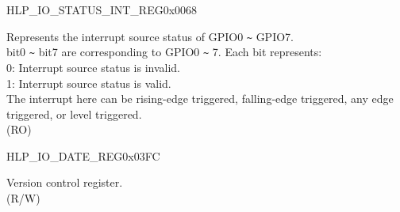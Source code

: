 \begin{register}{H}{LP\_IO\_STATUS\_INT\_REG}{0x0068}\label{regdesc:LPIOSTATUSINTREG}
%
%
\regnewline%
\begin{regdesc}\begin{reglist}
\label{fielddesc:LPGPIOSTATUSINTNEXT}\item [LP\_GPIO\_STATUS\_INT\_NEXT] Represents the interrupt source status of GPIO0 \verb+~+ GPIO7.\\
bit0 \verb+~+ bit7 are corresponding to GPIO0 \verb+~+ 7. Each bit represents:\\
0: Interrupt source status is invalid.\\
1: Interrupt source status is valid.\\ 
The interrupt here can be rising-edge triggered, falling-edge triggered, any edge triggered, or level triggered.\\  (RO)
\end{reglist}\end{regdesc}
\end{register}




\begin{register}{H}{LP\_IO\_DATE\_REG}{0x03FC}\label{regdesc:LPIODATEREG}
%
%
\regnewline%
\begin{regdesc}\begin{reglist}
\label{fielddesc:LPIODATE}\item [LP\_IO\_DATE] Version control register. \\
(R/W)
\end{reglist}\end{regdesc}
\end{register}

